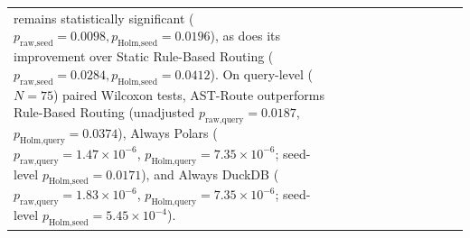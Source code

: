 \documentclass[10pt,a4paper]{article}
\newenvironment{fitasttable}{%
  \begin{lrbox}{\asttblbox}%
}{%
  \end{lrbox}%
  \sbox{\asttblboxB}{%
    \ifdim\wd\asttblbox>0.96\textwidth
      \resizebox{0.96\textwidth}{!}{\usebox{\asttblbox}}%
    \else
      \usebox{\asttblbox}%
    \fi
  }%
  \ifdim\ht\asttblboxB>0.72\textheight
    \resizebox{!}{0.72\textheight}{\usebox{\asttblboxB}}%
  \else
    \usebox{\asttblboxB}%
  \fi
}
\begin{document}
\begin{table}[!htbp]
\begin{fitasttable}
\begin{tabular}{@{}lcccccccccc@{}}
remains statistically significant ($p_{\text{raw,seed}}=0.0098, p_{\text{Holm,seed}}=0.0196$), as does its improvement over Static Rule-Based Routing ($p_{\text{raw,seed}}=0.0284, p_{\text{Holm,seed}}=0.0412$). On query-level ($N=75$) paired Wilcoxon tests, AST-Route outperforms Rule-Based Routing (unadjusted $p_{\text{raw,query}}=0.0187$, $p_{\text{Holm,query}}=0.0374$), Always Polars ($p_{\text{raw,query}}=1.47\times 10^{-6}$, $p_{\text{Holm,query}}=7.35\times 10^{-6}$; seed-level $p_{\text{Holm,seed}}=0.0171$), and Always DuckDB ($p_{\text{raw,query}}=1.83\times 10^{-6}$, $p_{\text{Holm,query}}=7.35\times 10^{-6}$; seed-level $p_{\text{Holm,seed}}=5.45\times 10^{-4}$).}\\
\end{tabular}
\end{fitasttable}
\end{table}
\end{document}

